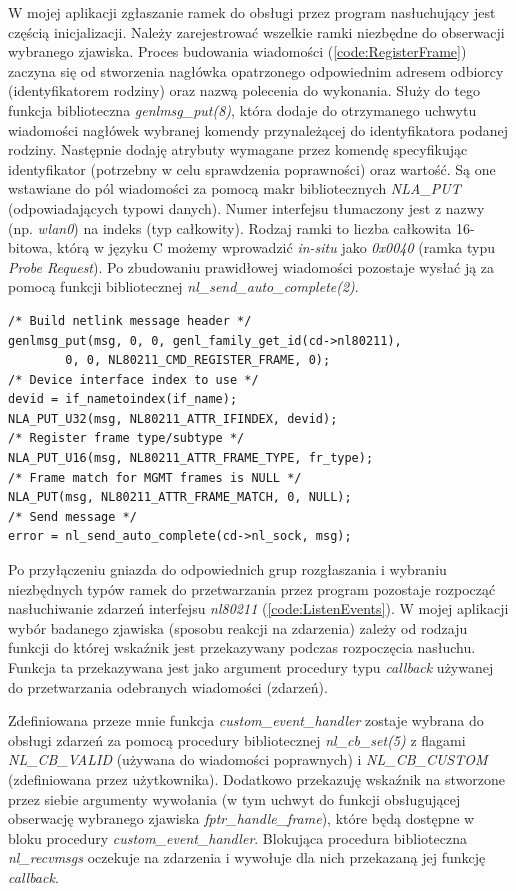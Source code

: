 W mojej aplikacji zgłaszanie ramek do obsługi przez program nasłuchujący jest częścią inicjalizacji. Należy zarejestrować wszelkie ramki niezbędne do obserwacji wybranego zjawiska. Proces budowania wiadomości (\ref{code:RegisterFrame}) zaczyna się od stworzenia nagłówka opatrzonego odpowiednim adresem odbiorcy (identyfikatorem rodziny) oraz nazwą polecenia do wykonania. Służy do tego funkcja biblioteczna \emph{genlmsg\_put(8)}, która dodaje do otrzymanego uchwytu wiadomości nagłówek wybranej komendy przynależącej do identyfikatora podanej rodziny. Następnie dodaję atrybuty wymagane przez komendę specyfikując identyfikator (potrzebny w celu sprawdzenia poprawności) oraz wartość. Są one wstawiane do pól wiadomości za pomocą makr bibliotecznych \emph{NLA\_PUT} (odpowiadających typowi danych). Numer interfejsu tłumaczony jest z nazwy (np. \emph{wlan0}) na indeks (typ całkowity). Rodzaj ramki to liczba całkowita 16-bitowa, którą w języku C możemy wprowadzić \emph{in-situ} jako \emph{0x0040} (ramka typu \emph{Probe Request}). Po zbudowaniu prawidłowej wiadomości pozostaje wysłać ją za pomocą funkcji bibliotecznej \emph{nl\_send\_auto\_complete(2)}. 

\begin{lstlisting}[frame=tb]
/* Build netlink message header */
genlmsg_put(msg, 0, 0, genl_family_get_id(cd->nl80211), 
        0, 0, NL80211_CMD_REGISTER_FRAME, 0);
/* Device interface index to use */
devid = if_nametoindex(if_name);
NLA_PUT_U32(msg, NL80211_ATTR_IFINDEX, devid);
/* Register frame type/subtype */
NLA_PUT_U16(msg, NL80211_ATTR_FRAME_TYPE, fr_type);
/* Frame match for MGMT frames is NULL */
NLA_PUT(msg, NL80211_ATTR_FRAME_MATCH, 0, NULL);       
/* Send message */
error = nl_send_auto_complete(cd->nl_sock, msg);
\end{lstlisting}

Po przyłączeniu gniazda do odpowiednich grup rozgłaszania i wybraniu niezbędnych typów ramek do przetwarzania przez program pozostaje rozpocząć nasłuchiwanie zdarzeń interfejsu \emph{nl80211} (\ref{code:ListenEvents}). W mojej aplikacji wybór badanego zjawiska (sposobu reakcji na zdarzenia) zależy od rodzaju funkcji do której wskaźnik jest przekazywany podczas rozpoczęcia nasłuchu. Funkcja ta przekazywana jest jako argument procedury typu \emph{callback} używanej do przetwarzania odebranych wiadomości (zdarzeń). 

Zdefiniowana przeze mnie funkcja \emph{custom\_event\_handler} zostaje wybrana do obsługi zdarzeń za pomocą procedury bibliotecznej \emph{nl\_cb\_set(5)} z flagami \emph{NL\_CB\_VALID} (używana do wiadomości poprawnych) i \emph{NL\_CB\_CUSTOM} (zdefiniowana przez użytkownika). Dodatkowo przekazuję wskaźnik na stworzone przez siebie argumenty wywołania (w tym uchwyt do funkcji obsługującej obserwację wybranego zjawiska \emph{fptr\_handle\_frame}), które będą dostępne w bloku procedury \emph{custom\_event\_handler}. Blokująca procedura biblioteczna \emph{nl\_recvmsgs} oczekuje na zdarzenia i wywołuje dla nich przekazaną jej funkcję \emph{callback}. 

